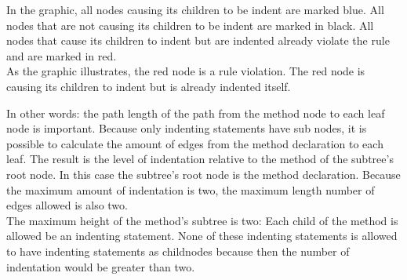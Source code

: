 In the graphic, all nodes causing its children to be indent are marked blue. All nodes that are not causing its children to be indent are marked in black. 
All nodes that cause its children to indent but are indented already violate the rule and are marked in red. 
\\

As the graphic illustrates, the red node is a rule violation. The red node is causing its children to indent but is already indented itself. 
\\

\label{ast:rule1}

In other words: the path length of the path from the method node to each leaf node is important. Because only indenting statements have sub nodes, it is possible to calculate the amount of edges from the method declaration to each leaf. The result is the level of indentation relative to the method of the subtree's root node. In this case the subtree's root node is the method declaration. Because the maximum amount of indentation is two, the maximum length number of edges allowed is also two.
\\

The maximum height of the method's subtree is two: Each child of the method is allowed be an indenting statement. None of these indenting statements is allowed to have indenting statements as childnodes because then the number of indentation would be greater than two. 
\\

